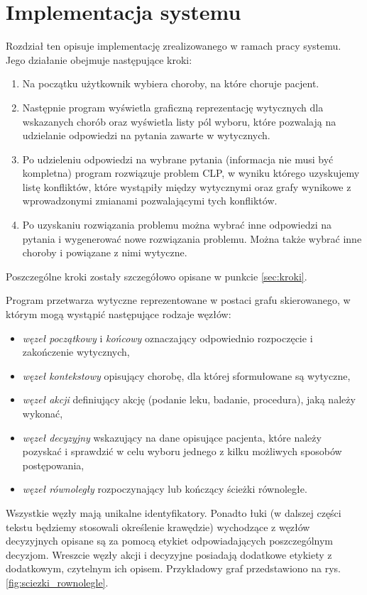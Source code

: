 \chapter{Implementacja systemu}

Rozdział ten opisuje implementację zrealizowanego w ramach pracy systemu. Jego działanie obejmuje następujące kroki: 
\begin{enumerate}
\item Na początku użytkownik wybiera choroby, na które choruje pacjent. 
\item Następnie program wyświetla graficzną reprezentację wytycznych dla wskazanych chorób oraz wyświetla listy pól wyboru, które pozwalają na udzielanie odpowiedzi na pytania zawarte w wytycznych. 
\item Po udzieleniu odpowiedzi na wybrane pytania (informacja nie musi być kompletna) program rozwiązuje problem CLP, w wyniku którego uzyskujemy listę konfliktów, które wystąpiły między wytycznymi oraz grafy wynikowe z wprowadzonymi zmianami pozwalającymi tych konfliktów. 
\item Po uzyskaniu rozwiązania problemu można wybrać inne odpowiedzi na pytania i wygenerować nowe rozwiązania problemu. Można także wybrać inne choroby i powiązane z nimi wytyczne.
\end{enumerate}
Poszczególne kroki zostały szczegółowo opisane w punkcie \ref{sec:kroki}. 

Program przetwarza wytyczne reprezentowane w postaci grafu skierowanego, w którym mogą wystąpić następujące rodzaje węzłów:
\begin{itemize}
\item \textit{węzeł początkowy} i \textit{końcowy} oznaczający odpowiednio rozpoczęcie i zakończenie wytycznych,
\item \textit{węzeł kontekstowy} opisujący chorobę, dla której sformułowane są wytyczne,
\item \textit{węzeł akcji} definiujący akcję (podanie leku, badanie, procedura), jaką należy wykonać,
\item \textit{węzeł decyzyjny} wskazujący na dane opisujące pacjenta, które należy pozyskać i sprawdzić w celu wyboru jednego z kilku możliwych sposobów postępowania,
\item \textit{węzeł równoległy} rozpoczynający lub kończący ścieżki równoległe.
\end{itemize}

Wszystkie węzły mają unikalne identyfikatory. Ponadto łuki (w dalszej części tekstu będziemy stosowali określenie krawędzie) wychodzące z węzłów decyzyjnych opisane są za pomocą etykiet odpowiadających poszczególnym decyzjom. Wreszcie węzły akcji i decyzyjne posiadają dodatkowe etykiety z dodatkowym, czytelnym ich opisem. Przykładowy graf przedstawiono na rys. \ref{fig:sciezki_rownolegle}. 

